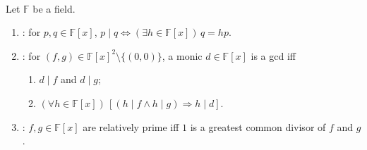 \begin{definition} \label{def:polynomial-divisibility-gcd-coprime} \\
Let $\mathbb{F}$ be a field.
\begin{enumerate}[label=(\roman*)]
\setlength{\itemsep}{0pt}
\item {}: for $p,q\in\mathbb{F}[x]$, $p\mid q\Longleftrightarrow(\exists h\in\mathbb{F}[x])\,q=hp$.
\item {}: for $(f,g)\in\mathbb{F}[x]^2\setminus\{(0,0)\}$, a monic $d\in\mathbb{F}[x]$ is a gcd iff
\begin{enumerate}[label=(\alph*)]
\setlength{\itemsep}{0pt}
\item $d\mid f$ and $d\mid g$;
\item $(\forall h\in\mathbb{F}[x])\,[(h\mid f\land h\mid g)\Rightarrow h\mid d]$.
\end{enumerate}
\item {}: $f,g\in\mathbb{F}[x]$ are relatively prime iff $1$ is a greatest common divisor of $f$ and $g$.
\end{enumerate}
\end{definition}

